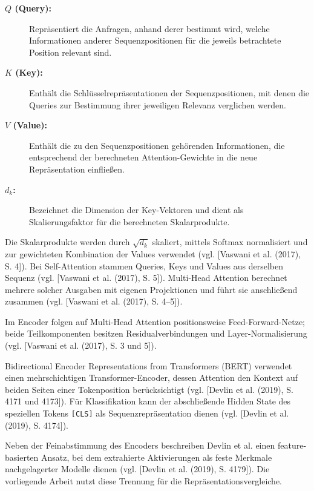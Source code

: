 \begin{description}
    \item[\textbf{$Q$ (Query):}]
    Repräsentiert die Anfragen, anhand derer bestimmt wird, welche
    Informationen anderer Sequenzpositionen für die jeweils betrachtete
    Position relevant sind.

    \item[\textbf{$K$ (Key):}]
    Enthält die Schlüsselrepräsentationen der Sequenzpositionen, mit denen
    die Queries zur Bestimmung ihrer jeweiligen Relevanz verglichen werden.

    \item[\textbf{$V$ (Value):}]
    Enthält die zu den Sequenzpositionen gehörenden Informationen, die
    entsprechend der berechneten Attention-Gewichte in die neue
    Repräsentation einfließen.

    \item[\textbf{$d_k$:}]
    Bezeichnet die Dimension der Key-Vektoren und dient als
    Skalierungsfaktor für die berechneten Skalarprodukte.
\end{description}

Die Skalarprodukte werden durch $\sqrt{d_k}$ skaliert, mittels Softmax normalisiert und zur gewichteten Kombination der Values verwendet (vgl. [Vaswani et al. (2017), S. 4]). Bei Self-Attention stammen Queries, Keys und Values aus derselben Sequenz (vgl. [Vaswani et al. (2017), S. 5]). Multi-Head Attention berechnet mehrere solcher Ausgaben mit eigenen Projektionen und führt sie anschließend zusammen (vgl. [Vaswani et al. (2017), S. 4--5]).

Im Encoder folgen auf Multi-Head Attention positionsweise Feed-Forward-Netze; beide Teilkomponenten besitzen Residualverbindungen und Layer-Normalisierung (vgl. [Vaswani et al. (2017), S. 3 und 5]).

Bidirectional Encoder Representations from Transformers (BERT) verwendet einen mehrschichtigen Transformer-Encoder, dessen Attention den Kontext auf beiden Seiten einer Tokenposition berücksichtigt (vgl. [Devlin et al. (2019), S. 4171 und 4173]). Für Klassifikation kann der abschließende Hidden State des speziellen Tokens \texttt{[CLS]} als Sequenzrepräsentation dienen (vgl. [Devlin et al. (2019), S. 4174]).

Neben der Feinabstimmung des Encoders beschreiben Devlin et al. einen feature-basierten Ansatz, bei dem extrahierte Aktivierungen als feste Merkmale nachgelagerter Modelle dienen (vgl. [Devlin et al. (2019), S. 4179]). Die vorliegende Arbeit nutzt diese Trennung für die Repräsentationsvergleiche.

